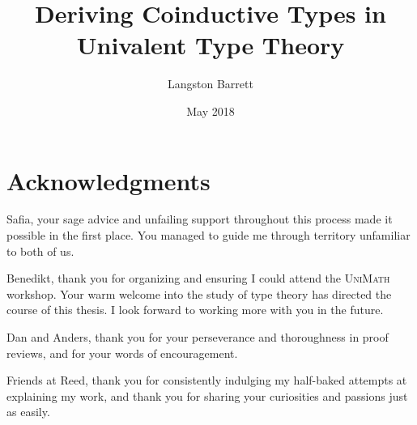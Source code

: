\documentclass[12pt,twoside]{reedthesis}
\title{Deriving Coinductive Types in Univalent Type Theory}
\author{Langston Barrett}
\date{May 2018}
\let\oldindex\index
\renewcommand{\index}[1]
               {\oldindex{#1}\marginpar{\footnotesize\color{index}index: #1}}
\newcommand{\indeX}{\oldindex}
\newcommand{\indeX}{\index}
\newcommand{\software}[1]{{\textsc{#1}}\indeX{#1}}
\newcommand{\UniMath}{\software{UniMath}}
\begin{document}
\maketitle
\frontmatter %
\pagestyle{empty} %


\chapter*{Acknowledgments}

\noindent Safia, your sage advice and unfailing support throughout this
process made it possible in the first place. You managed to guide me through
territory unfamiliar to both of us.

\vspace{0.6em}

\noindent Benedikt, thank you for organizing and ensuring I could attend
the \UniMath{} workshop. Your warm welcome into the study of type theory
has directed the course of this thesis. I look forward to working more with
you in the future.

\vspace{0.6em}

\noindent Dan and Anders, thank you for your perseverance and thoroughness in
proof reviews, and for your words of encouragement. 

\vspace{0.6em}

\noindent Friends at Reed, thank you for consistently indulging my half-baked
attempts at explaining my work, and thank you for sharing your curiosities and
passions just as easily.



\end{document}
